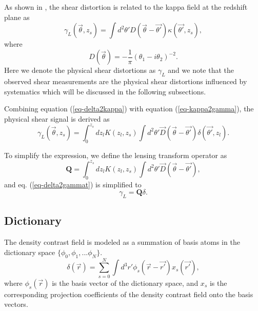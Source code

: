 \documentclass[twocolumn]{aastex62}
\begin{document}
As shown in \citet{massMap-KS1993}, the shear distortion is related to the kappa field at the redshift plane as
\begin{equation}\label{eq-kappa2gamma}
\gamma_L(\vec{\theta},z_s) = \int  d^2 \theta' D(\vec{\theta}-\vec{\theta'}) \kappa(\vec{\theta'},z_s),
\end{equation}
where
\begin{equation}
D(\vec{\theta})=-\frac{1}{\pi}(\theta_1-i\theta_2)^{-2}.
\end{equation}
Here we denote the physical shear distortions as $\gamma_L$ and we note that the observed shear measurements are the
physical shear distortions influenced by systematics which will be discussed in the following subsections.

Combining equation (\ref{eq-delta2kappa}) with equation (\ref{eq-kappa2gamma}), the physical shear signal is derived as
\begin{equation}\label{eq-delta2gammat}
\gamma_L(\vec{\theta},z_s) = \int_0^{z_s} dz_l K(z_l,z_s) \int d^2 \theta' \vec{D}(\vec{\theta}-\vec{\theta'}) \delta(\vec{\theta'},z_l).
\end{equation}

To simplify the expression, we define the lensing transform operator as
\begin{equation}
\mathbf{Q}=\int_0^{z_s} dz_l K(z_l,z_s) \int d^2 \theta'  \vec{D}(\vec{\theta}-\vec{\theta'}),
\end{equation}
and eq. (\ref{eq-delta2gammat}) is simplified to
\begin{equation} \label{eq-delta2gammat-simp}
\gamma_L=\mathbf{Q}\delta.
\end{equation}

\subsection{Dictionary}
\label{subsec:method-dictionary}

The density contrast field is modeled as a summation of basis atoms in the dictionary space $\{\phi_0,\phi_1,...\phi_{N}\}$.
\begin{equation}\label{eq-x2delta}
\delta(\vec{r}) = \sum_{s=0}^{N} \int d^3 r' \phi_s(\vec{r}-\vec{r'}) x_s(\vec{r'}),
\end{equation}
where $\phi_s(\vec{r})$ is the basis vector of the dictionary space, and $x_s$ is the corresponding projection
coefficients of the density contrast field onto the basis vectors.
\end{document}
